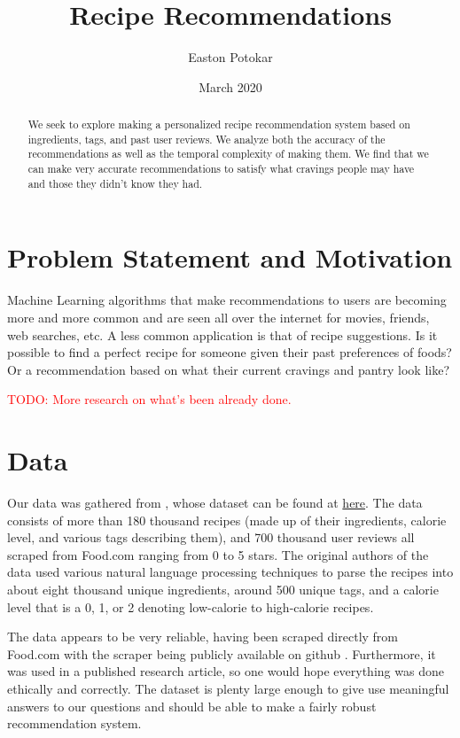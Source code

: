 \documentclass[11pt]{article}
\title{Recipe Recommendations}
\author{Easton Potokar}
\date{March 2020}
\newcommand\todo[1]{\textcolor{red}{TODO: #1 \\}}
\begin{document}
\maketitle

\begin{abstract}
    We seek to explore making a personalized recipe recommendation system based on ingredients, tags, and past user reviews. We analyze both the accuracy of the recommendations as well as the temporal complexity of making them. We find that we can make very accurate recommendations to satisfy what cravings people may have and those they didn't know they had.
\end{abstract}

\section{Problem Statement and Motivation}
Machine Learning algorithms that make recommendations to users are becoming more and more common and are seen all over the internet for movies, friends, web searches, etc. A less common application is that of recipe suggestions. Is it possible to find a perfect recipe for someone given their past preferences of foods? Or a recommendation based on what their current cravings and pantry look like? 

\todo{More research on what's been already done.}

\section{Data}
Our data was gathered from \cite{data}, whose dataset can be found at \href{https://www.kaggle.com/shuyangli94/food-com-recipes-and-user-interactions}{here}. The data consists of more than 180 thousand recipes (made up of their ingredients, calorie level, and various tags describing them), and 700 thousand user reviews all scraped from Food.com ranging from 0 to 5 stars. The original authors of the data used various natural language processing techniques to parse the recipes into about eight thousand unique ingredients, around 500 unique tags, and a calorie level that is a 0, 1, or 2 denoting low-calorie to high-calorie recipes.

The data appears to be very reliable, having been scraped directly from Food.com with the scraper being publicly available on github \cite{data_scraper}. Furthermore, it was used in a published research article, so one would hope everything was done ethically and correctly. The dataset is plenty large enough to give use meaningful answers to our questions and should be able to make a fairly robust recommendation system.
\end{document}

